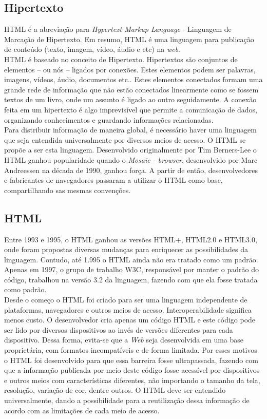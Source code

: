 \subsection{Hipertexto}
HTML é a abreviação para \textit{Hypertext Markup Language} - Linguagem de 
Marcação de Hipertexto. Em resumo, HTML é uma linguagem para publicação de 
conteúdo (texto, imagem, vídeo, áudio e etc) na \textit{web}.\\
HTML é baseado no conceito de Hipertexto. Hipertextos são conjuntos de 
elementos – ou nós – ligados por conexões. Estes elementos podem ser palavras, 
imagens, vídeos, áudio, documentos etc.. Estes elementos conectados formam uma 
grande rede de informação que não estão conectados linearmente como se fossem 
textos de um livro, onde um assunto é ligado ao outro seguidamente. A conexão 
feita em um hipertexto é algo imprevisível que permite a comunicação de dados, 
organizando conhecimentos e guardando informações relacionadas.\\
Para distribuir informação de maneira global, é necessário haver uma linguagem 
que seja entendida universalmente por diversos meios de acesso. O HTML se 
propõe a ser esta linguagem. Desenvolvido originalmente por Tim Berners-Lee o 
HTML ganhou popularidade quando o \textit{Mosaic - browser}, desenvolvido por 
Marc Andreessen na década de 1990, ganhou força. A partir de então, 
desenvolvedores e fabricantes de navegadores passaram a utilizar o HTML como 
base, compartilhando sas mesmas convenções.\\
\subsection{HTML}
Entre 1993 e 1995, o HTML ganhou as versões HTML+, HTML2.0 e HTML3.0, onde 
foram propostas diversas mudanças para enriquecer as possibilidades da 
linguagem. Contudo, até 1.995 o HTML ainda não era tratado como um padrão. 
Apenas em 1997, o grupo de trabalho W3C, responsável por manter o padrão do 
código, trabalhou na versão 3.2 da linguagem, fazendo com que ela fosse tratada 
como padrão.\\
Desde o começo o HTML foi criado para ser uma linguagem independente de 
plataformas, navegadores e outros meios de acesso. Interoperabilidade significa 
menos custo. O desenvolvedor cria apenas um código HTML e este código pode ser 
lido por diversos dispositivos ao invés de versões diferentes para cada 
dispositivo. Dessa forma, evita-se que a \textit{Web} seja desenvolvida em uma 
base proprietária, com formatos incompatíveis e de forma limitada. Por esses 
motivos o HTML foi desenvolvido para que essa barreira fosse ultrapassada, 
fazendo com que a informação publicada por meio deste código fosse acessível 
por dispositivos e outros meios com características diferentes, não importando 
o tamanho da tela, resolução, variação de cor, dentre outros. O HTML deve ser 
entendido universalmente, dando a possibilidade para a reutilização dessa 
informação de acordo com as limitações de cada meio de acesso.
